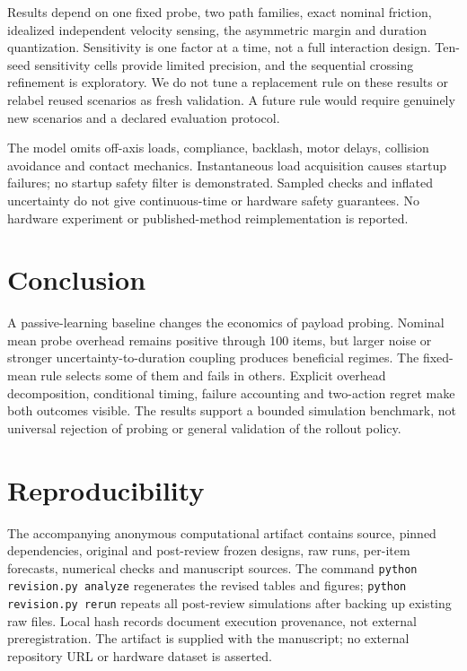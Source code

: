 \documentclass[10pt,twocolumn]{article}
\begin{document}
Results depend on one fixed probe, two path families, exact nominal friction, idealized independent velocity sensing, the asymmetric margin and duration quantization. Sensitivity is one factor at a time, not a full interaction design. Ten-seed sensitivity cells provide limited precision, and the sequential crossing refinement is exploratory. We do not tune a replacement rule on these results or relabel reused scenarios as fresh validation. A future rule would require genuinely new scenarios and a declared evaluation protocol.

The model omits off-axis loads, compliance, backlash, motor delays, collision avoidance and contact mechanics. Instantaneous load acquisition causes startup failures; no startup safety filter is demonstrated. Sampled checks and inflated uncertainty do not give continuous-time or hardware safety guarantees. No hardware experiment or published-method reimplementation is reported.

\section{Conclusion}
A passive-learning baseline changes the economics of payload probing. Nominal mean probe overhead remains positive through 100 items, but larger noise or stronger uncertainty-to-duration coupling produces beneficial regimes. The fixed-mean rule selects some of them and fails in others. Explicit overhead decomposition, conditional timing, failure accounting and two-action regret make both outcomes visible. The results support a bounded simulation benchmark, not universal rejection of probing or general validation of the rollout policy.

\section*{Reproducibility}
The accompanying anonymous computational artifact contains source, pinned dependencies, original and post-review frozen designs, raw runs, per-item forecasts, numerical checks and manuscript sources. The command \texttt{python revision.py analyze} regenerates the revised tables and figures; \texttt{python revision.py rerun} repeats all post-review simulations after backing up existing raw files. Local hash records document execution provenance, not external preregistration. The artifact is supplied with the manuscript; no external repository URL or hardware dataset is asserted.

{\small
\setlength{\parskip}{0pt}


}
\end{document}
